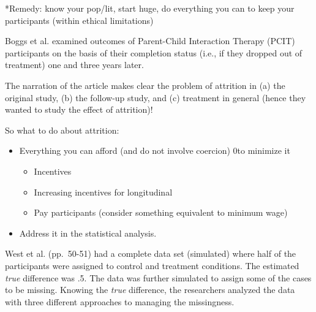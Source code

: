 \documentclass[
  english,
]{book}
\providecommand{\tightlist}{%
  \setlength{\itemsep}{0pt}\setlength{\parskip}{0pt}}
\begin{document}
*Remedy: know your pop/lit, start huge, do everything you can to keep your participants (within ethical limitations)

Boggs et al. \citeyearpar{boggs_outcomes_2005} examined outcomes of Parent-Child Interaction Therapy (PCIT) participants on the basis of their completion status (i.e., if they dropped out of treatment) one and three years later.

The narration of the article makes clear the problem of attrition in (a) the original study, (b) the follow-up study, and (c) treatment in general (hence they wanted to study the effect of attrition)!

So what to do about attrition:

\begin{itemize}
\tightlist
\item
  Everything you can afford (and do not involve coercion) 0to minimize it

  \begin{itemize}
  \tightlist
  \item
    Incentives
  \item
    Increasing incentives for longitudinal
  \item
    Pay participants (consider something equivalent to minimum wage)
  \end{itemize}
\item
  Address it in the statistical analysis.
\end{itemize}

West et al. \citeyearpar{reis_causal_2000}(pp.~50-51) had a complete data set (simulated) where half of the participants were assigned to control and treatment conditions. The estimated \emph{true} difference was .5. The data was further simulated to assign some of the cases to be missing. Knowing the \emph{true} difference, the researchers analyzed the data with three different approaches to managing the missingness.
\end{document}
